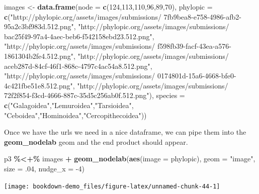 \documentclass[
]{book}
\newenvironment{Shaded}{\begin{snugshade}}{\end{snugshade}}
\newcommand{\DataTypeTok}[1]{\textcolor[rgb]{0.13,0.29,0.53}{#1}}
\newcommand{\DecValTok}[1]{\textcolor[rgb]{0.00,0.00,0.81}{#1}}
\newcommand{\FloatTok}[1]{\textcolor[rgb]{0.00,0.00,0.81}{#1}}
\newcommand{\KeywordTok}[1]{\textcolor[rgb]{0.13,0.29,0.53}{\textbf{#1}}}
\newcommand{\NormalTok}[1]{#1}
\newcommand{\OperatorTok}[1]{\textcolor[rgb]{0.81,0.36,0.00}{\textbf{#1}}}
\newcommand{\StringTok}[1]{\textcolor[rgb]{0.31,0.60,0.02}{#1}}
\begin{document}
\begin{Shaded}
\begin{Highlighting}[]
\NormalTok{images \textless{}{-}}\StringTok{ }\KeywordTok{data.frame}\NormalTok{(}\DataTypeTok{node =} \KeywordTok{c}\NormalTok{(}\DecValTok{124}\NormalTok{,}\DecValTok{113}\NormalTok{,}\DecValTok{110}\NormalTok{,}\DecValTok{96}\NormalTok{,}\DecValTok{89}\NormalTok{,}\DecValTok{70}\NormalTok{),}
\DataTypeTok{phylopic =} \KeywordTok{c}\NormalTok{(}\StringTok{"http://phylopic.org/assets/images/submissions/}
\StringTok{7fb9bea8{-}e758{-}4986{-}afb2{-}95a2c3bf983d.512.png"}\NormalTok{,}
\StringTok{"http://phylopic.org/assets/images/submissions/}
\StringTok{bac25f49{-}97a4{-}4aec{-}beb6{-}f542158ebd23.512.png"}\NormalTok{,}
\StringTok{"http://phylopic.org/assets/images/submissions/}
\StringTok{f598fb39{-}facf{-}43ea{-}a576{-}1861304b2fe4.512.png"}\NormalTok{,}
\StringTok{"http://phylopic.org/assets/images/submissions/}
\StringTok{aceb287d{-}84cf{-}46f1{-}868c{-}4797c4ac54a8.512.png"}\NormalTok{,}
\StringTok{"http://phylopic.org/assets/images/submissions/}
\StringTok{0174801d{-}15a6{-}4668{-}bfe0{-}4c421fbe51e8.512.png"}\NormalTok{,}
\StringTok{"http://phylopic.org/assets/images/submissions/}
\StringTok{72f2f854{-}f3cd{-}4666{-}887c{-}35d5c256ab0f.512.png"}\NormalTok{),}
\DataTypeTok{species =} \KeywordTok{c}\NormalTok{(}\StringTok{"Galagoidea"}\NormalTok{,}\StringTok{"Lemuroidea"}\NormalTok{,}\StringTok{"Tarsioidea"}\NormalTok{,}
\StringTok{"Ceboidea"}\NormalTok{,}\StringTok{"Hominoidea"}\NormalTok{,}\StringTok{"Cercopithecoidea"}\NormalTok{))}
\end{Highlighting}
\end{Shaded}

Once we have the urls we need in a nice dataframe, we can pipe them into the \textbf{geom\_nodelab} geom and the end product should appear.

\begin{Shaded}
\begin{Highlighting}[]
\NormalTok{p3 }\OperatorTok{\%\textless{}+\%}\StringTok{ }\NormalTok{images }\OperatorTok{+}
\StringTok{  }\KeywordTok{geom\_nodelab}\NormalTok{(}\KeywordTok{aes}\NormalTok{(}\DataTypeTok{image =}\NormalTok{ phylopic), }\DataTypeTok{geom =} \StringTok{"image"}\NormalTok{, }\DataTypeTok{size =} \FloatTok{.04}\NormalTok{, }\DataTypeTok{nudge\_x =} \DecValTok{{-}4}\NormalTok{)}
\end{Highlighting}
\end{Shaded}

\begin{center}\texttt{[image: bookdown-demo\_files/figure-latex/unnamed-chunk-44-1]} \end{center}
\end{document}
